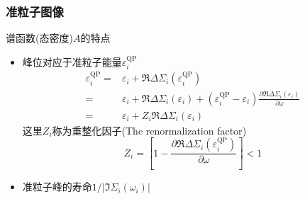 \documentclass[cjk,slidestop,compress,mathserif,blue]{beamer}
\begin{document}
\frame
{
	\frametitle{准粒子图像}
	谱函数(态密度)$A$的特点
	\begin{itemize}
		\item 峰位对应于准粒子能量$\varepsilon_i^{\mathrm{QP}}$
			\begin{displaymath}
				\begin{aligned}
					\varepsilon_i^{\mathrm{QP}}=&\varepsilon_i+\Re\Delta\Sigma_i(\varepsilon_i^{\mathrm{QP}})\\
					=&\varepsilon_i+\Re\Delta\Sigma_i(\varepsilon_i)+(\varepsilon_i^{\mathrm{QP}}-\varepsilon_i)\frac{\partial\Re\Delta\Sigma_i(\varepsilon_i)}{\partial\omega}\\
					=&\varepsilon_i+Z_i\Re\Delta\Sigma_i(\varepsilon_i)
				\end{aligned}
			\end{displaymath}
		这里$Z_i$称为重整化因子(\textrm{The renormalization factor})
			\begin{displaymath}
				Z_i=\left[ 1-\frac{\partial\Re\Delta\Sigma_i(\varepsilon_i^{\mathrm{QP}})}{\partial\omega} \right]<1
			\end{displaymath}
		\item 准粒子峰的寿命$1/|\Im\Sigma_i(\omega_i)|$
	\end{itemize}
}
\end{document}
